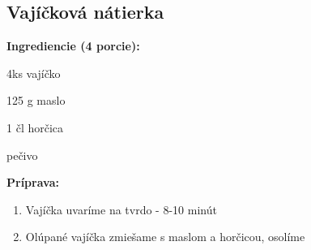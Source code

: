 \setcounter{step}{0}

\subsection{ Vajíčková nátierka }

\begin{ingredient}
  
  \def\portions{  }
  \textbf{ {\normalsize Ingrediencie (4 porcie):} }

  \begin{main}
      \item 4ks vajíčko
      \item 125 g maslo
      \item 1 čl horčica
      \item pečivo
  \end{main}
  
\end{ingredient}
\begin{recipe}
\textbf{ {\normalsize Príprava:} }
\begin{enumerate}

  \item{Vajíčka uvaríme na tvrdo - 8-10 minút}
  \item{Olúpané vajíčka zmiešame s maslom a horčicou, osolíme}

\end{enumerate}
\end{recipe}

\begin{notes}
  
\end{notes}	
\clearpage
